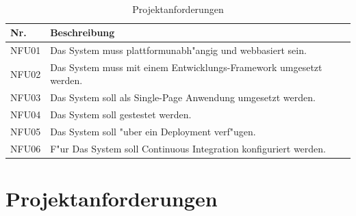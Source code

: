 \documentclass[a4paper, 11pt]{scrreprt}
\begin{document}
\begin{table}[H]

\caption{Projektanforderungen}

\ \\

\par

\label{tab:Tabelle2}

\centering

\begin{tabular}{|p{2.5cm} p{12cm}| ll}

\hline
Nr.	& Beschreibung\\

\hline
NFU01 &	Das System muss plattformunabh"angig und webbasiert sein. \\

\hline
NFU02 &	Das System muss mit einem Entwicklungs-Framework umgesetzt werden.\\

\hline
NFU03 &	Das System soll als Single-Page Anwendung umgesetzt werden.\\

\hline
NFU04 &	Das System soll gestestet werden.\\

\hline
NFU05 &	Das System soll "uber ein Deployment verf"ugen.\\

\hline
NFU06 &	F"ur Das System soll Continuous Integration konfiguriert werden.\\

\hline

\end{tabular}

\end{table}

\section{Projektanforderungen}
\end{document}
